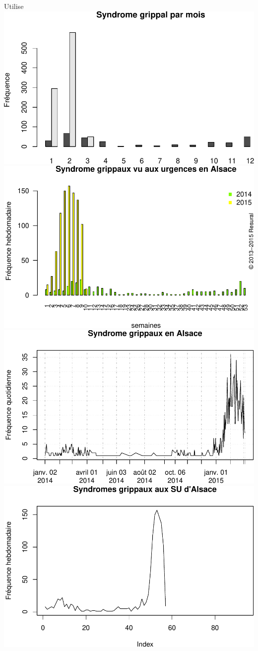 \documentclass[]{article}
\begin{document}
Utilise \includegraphics{dp_files/figure-latex/grippe2-1.pdf}
\includegraphics{dp_files/figure-latex/grippe2-2.pdf}
\includegraphics{dp_files/figure-latex/grippe2-3.pdf}
\includegraphics{dp_files/figure-latex/grippe2-4.pdf}
\end{document}
